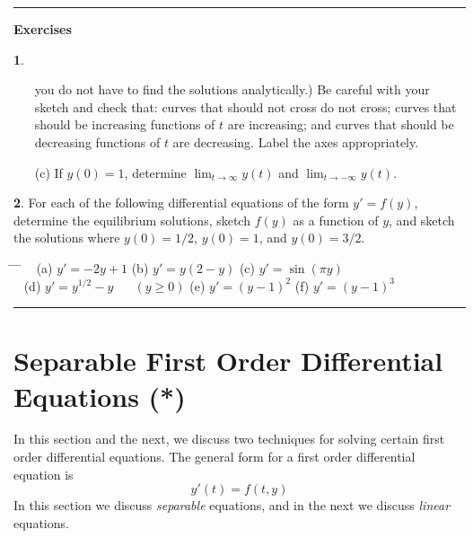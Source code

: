 \documentclass[reqno]{immbook}
\newcommand{\ds}{\displaystyle}
\numberwithin{equation}{chapter}
\numberwithin{question}{section}
\numberwithin{theorem}{chapter}
\numberwithin{figure}{chapter}
\theoremstyle{definition}
\newtheorem{exercise}{}[section]
\newenvironment{exercises}%
{%
\medskip\hrule\medskip\noindent\textbf{Exercises}%
}%
{%
\medskip\hrule
}
\begin{document}
\begin{exercises}
\begin{exercise}
\begin{enumerate}
you do not have to find the solutions analytically.)
Be careful with your sketch and check that:
curves that should not cross do not
cross; curves that should be increasing functions of $t$
are increasing; and curves that should be decreasing functions
of $t$ are decreasing. Label the axes appropriately.
\item[(c)] If $y(0) = 1$, determine $\ds \lim_{t \rightarrow \infty} y(t)$
and $\ds \lim_{t\rightarrow -\infty} y(t)$.
\end{enumerate}
\end{exercise}
\begin{exercise}
For each of the following differential equations
of the form $y' = f(y)$,
determine the equilibrium solutions, sketch $f(y)$ as a function
of $y$, and sketch the solutions where $y(0)=1/2$, $y(0)=1$, and
$y(0)=3/2$.
\begin{tabbing}
\hspace*{0.25in} \= \hspace*{1.75in} \= \hspace*{1.5in} \= \kill
~ \> 
(a) $\ds y' = -2y + 1$ \>
(b) $\ds y' = y(2-y)$ \>
(c) $\ds y' = \sin(\pi y)$ \\[2pt]
~ \>
(d) $\ds y' = y^{1/2} - y$ ~~ $(y \ge 0)$ \>
(e) $\ds y' = (y-1)^2$ \>
(f) $\ds y' = (y-1)^3$
\end{tabbing}
\end{exercise}
\end{exercises}

\newpage

\section{Separable First Order Differential Equations (*)}

In this section and the next, we discuss
two techniques for solving certain first order
differential equations.
The general form for a first order differential equation is
\begin{equation}
   y'(t) = f(t,y)
\end{equation}
In this section we discuss \emph{separable} equations,
and in the next we discuss \emph{linear} equations.
\end{document}
